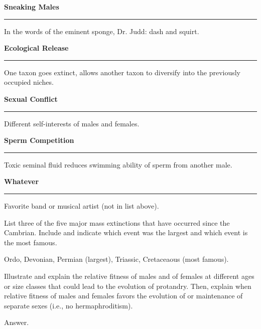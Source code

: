 \documentclass[12pt, addpoints]{exam}
\newcommand*\Matching[1]{
\ifprintanswers
	\textbf{#1}
\else
	\rule{2.1in}{0.5pt}
\fi
}
\newlength\matchlena
\newlength\matchlenb
\newcommand\MatchQuestion[2]{%
	\setlength\matchlenb{\linewidth}
	\addtolength\matchlenb{-\matchlena}
	\parbox[t]{\matchlena}{\Matching{#1}}\enspace\parbox[t]{\matchlenb}{#2}}
\begin{document}
\begin{questions}

\vspace{-1\baselineskip}
\fullwidth{%

}
\vspace{0.7\baselineskip}

\question\MatchQuestion{Sneaking Males}{In the words of the eminent sponge, Dr. Judd: dash and squirt.}
\vspace{0.7\baselineskip}

\question\MatchQuestion{Ecological Release}{One taxon goes extinct, allows another taxon to diversify into the previously occupied niches.}
\vspace{0.7\baselineskip}

\question\MatchQuestion{Sexual Conflict}{Different self-interests of males and females.}
\vspace{0.7\baselineskip}

\question\MatchQuestion{Sperm Competition}{Toxic seminal fluid reduces swimming ability of sperm from another male.}
\vspace{0.7\baselineskip}

\question\MatchQuestion{Whatever}{Favorite band or musical artist (not in list above).}
\vspace{0.7\baselineskip}

\question[5]
List three of the five major mass extinctions that have occurred since the Cambrian.  Include and indicate which event was the largest and which event is the most famous.
	\begin{solution}
	Ordo, Devonian, Permian (largest), Triassic, Cretaceaous (most famous).
	\end{solution}

\newpage

\question[10]
Illustrate and explain the relative fitness of males and of females at different ages or size classes that could lead to the evolution of protandry. Then, explain when relative fitness of males and females favors the evolution of or maintenance of separate sexes (i.e., no hermaphroditism).
	\begin{solution}
	Answer.
	\end{solution}	




\end{questions}
\end{document}

